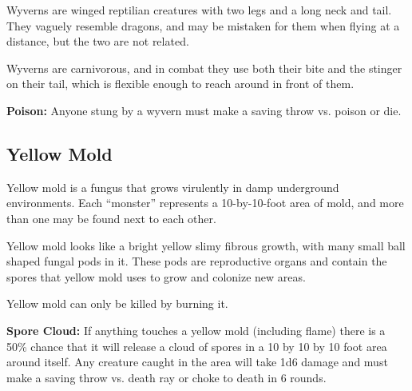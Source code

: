 \begin{multicols*}{2}
Wyverns are winged reptilian creatures with two legs and a long neck and tail. They vaguely resemble dragons, and may be mistaken for them when flying at a distance, but the two are not related.

Wyverns are carnivorous, and in combat they use both their bite and the stinger on their tail, which is flexible enough to reach around in front of them.

\textbf{Poison:} Anyone stung by a wyvern must make a saving throw vs. poison or die.

\subsection{Yellow Mold}

Yellow mold is a fungus that grows virulently in damp underground environments. Each “monster” represents a 10-by-10-foot area of mold, and more than one may be found next to each other.

Yellow mold looks like a bright yellow slimy fibrous growth, with many small ball shaped fungal pods in it. These pods are reproductive organs and contain the spores that yellow mold uses to grow and colonize new areas.

Yellow mold can only be killed by burning it.

\textbf{Spore Cloud:} If anything touches a yellow mold (including flame) there is a 50\% chance that it will release a cloud of spores in a 10 by 10 by 10 foot area around itself. Any creature caught in the area will take 1d6 damage and must make a saving throw vs. death ray or choke to death in 6 rounds.


\end{multicols*}
